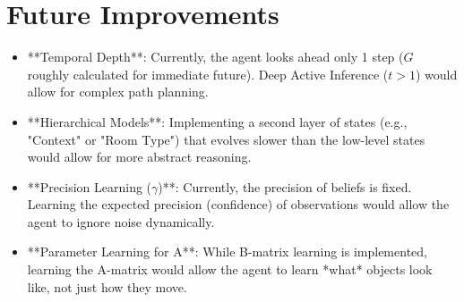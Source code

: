 \documentclass{article}
\begin{document}
\section{Future Improvements}
\begin{itemize}
    \item **Temporal Depth**: Currently, the agent looks ahead only 1 step ($G$ roughly calculated for immediate future). Deep Active Inference ($t > 1$) would allow for complex path planning.
    \item **Hierarchical Models**: Implementing a second layer of states (e.g., "Context" or "Room Type") that evolves slower than the low-level states would allow for more abstract reasoning.
    \item **Precision Learning ($\gamma$)**: Currently, the precision of beliefs is fixed. Learning the expected precision (confidence) of observations would allow the agent to ignore noise dynamically.
    \item **Parameter Learning for A**: While B-matrix learning is implemented, learning the A-matrix would allow the agent to learn *what* objects look like, not just how they move.
\end{itemize}
\end{document}
